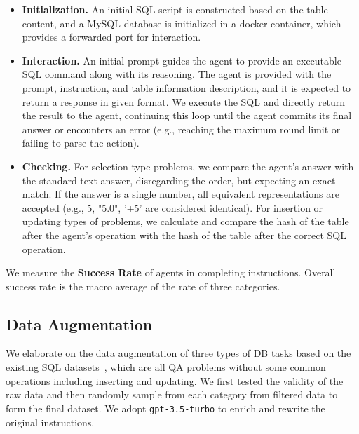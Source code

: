 \begin{itemize}[leftmargin=1.5em,itemsep=0pt,parsep=0.2em,topsep=0.0em,partopsep=0.0em]
\item \textbf{Initialization.} An initial SQL script is constructed based on the table content, and a MySQL database is initialized in a docker container, which provides a forwarded port for interaction.
\item \textbf{Interaction.} An initial prompt guides the agent to provide an executable SQL command along with its reasoning. The agent is provided with the prompt, instruction, and table information description, and it is expected to return a response in given format. We execute the SQL and directly return the result to the agent, continuing this loop until the agent commits its final answer or encounters an error (e.g., reaching the maximum round limit or failing to parse the action).
\item \textbf{Checking.} For selection-type problems, we compare the agent's answer with the standard text answer, disregarding the order, but expecting an exact match. If the answer is a single number, all equivalent representations are accepted (e.g., 5, "5.0", '+5' are considered identical). For insertion or updating types of problems, we calculate and compare the hash of the table after the agent's operation with the hash of the table after the correct SQL operation.
\end{itemize}

We measure the \textbf{Success Rate} of agents in completing instructions. Overall success rate is the macro average of the rate of three categories.


\subsection{Data Augmentation}
We elaborate on the data augmentation of three types of DB tasks based on the existing SQL datasets~\citep{zhongSeq2SQL2017,pasupat-liang-2015-compositional,iyyer-etal-2017-search-sqa,chen-etal-2020-hybridqa,nan2021fetaqa}, which are all QA problems without some common operations including inserting and updating. 
We first tested the validity of the raw data and then randomly sample from each category from filtered data to form the final dataset.
We adopt \texttt{gpt-3.5-turbo} to enrich and rewrite the original instructions.

